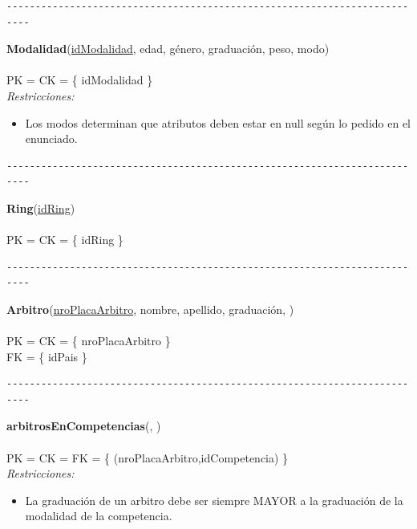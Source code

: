\begin{verbatim}
--------------------------------------------------------------------------
\end{verbatim}

\noindent\textbf{Modalidad}(\uline{idModalidad}, edad, género, graduación, peso, modo)
\\
\\
PK = CK = \{ idModalidad \} \\
\textit{Restricciones:}
\begin{itemize}
	\item Los modos determinan que atributos deben estar en null según lo pedido en el enunciado.
\end{itemize}


\begin{verbatim}
--------------------------------------------------------------------------
\end{verbatim}

\noindent\textbf{Ring}(\uline{idRing})
\\
\\
PK = CK = \{ idRing \} \\

\begin{verbatim}
--------------------------------------------------------------------------
\end{verbatim}

\noindent\textbf{Arbitro}(\uline{nroPlacaArbitro}, nombre, apellido, graduación, )
\\
\\
PK = CK = \{ nroPlacaArbitro \} \\
FK = \{ idPais \} \\

\begin{verbatim}
--------------------------------------------------------------------------
\end{verbatim}

\noindent\textbf{arbitrosEnCompetencias}(, )
\\
\\
PK = CK = FK = \{ (nroPlacaArbitro,idCompetencia) \} \\

\textit{Restricciones:}
\begin{itemize}
	\item La graduación de un arbitro debe ser siempre MAYOR a la graduación de la modalidad de la competencia.
\end{itemize}

